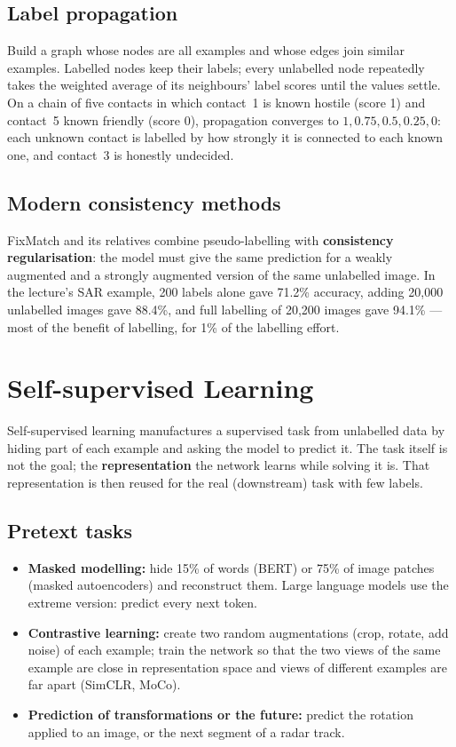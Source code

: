 \documentclass[11pt]{article}
\begin{document}
\subsection{Label propagation}
Build a graph whose nodes are all examples and whose edges join similar examples. Labelled nodes keep their labels; every unlabelled node repeatedly takes the weighted average of its neighbours' label scores until the values settle. On a chain of five contacts in which contact~1 is known hostile (score 1) and contact~5 known friendly (score 0), propagation converges to $1, 0.75, 0.5, 0.25, 0$: each unknown contact is labelled by how strongly it is connected to each known one, and contact~3 is honestly undecided.

\subsection{Modern consistency methods}
FixMatch and its relatives combine pseudo-labelling with \textbf{consistency regularisation}: the model must give the same prediction for a weakly augmented and a strongly augmented version of the same unlabelled image. In the lecture's SAR example, 200 labels alone gave 71.2\% accuracy, adding 20,000 unlabelled images gave 88.4\%, and full labelling of 20,200 images gave 94.1\% --- most of the benefit of labelling, for 1\% of the labelling effort.

\section{Self-supervised Learning}
Self-supervised learning manufactures a supervised task from unlabelled data by hiding part of each example and asking the model to predict it. The task itself is not the goal; the \textbf{representation} the network learns while solving it is. That representation is then reused for the real (downstream) task with few labels.
\subsection{Pretext tasks}
\begin{itemize}
\item \textbf{Masked modelling:} hide 15\% of words (BERT) or 75\% of image patches (masked autoencoders) and reconstruct them. Large language models use the extreme version: predict every next token.
\item \textbf{Contrastive learning:} create two random augmentations (crop, rotate, add noise) of each example; train the network so that the two views of the same example are close in representation space and views of different examples are far apart (SimCLR, MoCo).
\item \textbf{Prediction of transformations or the future:} predict the rotation applied to an image, or the next segment of a radar track.
\end{itemize}
\end{document}
